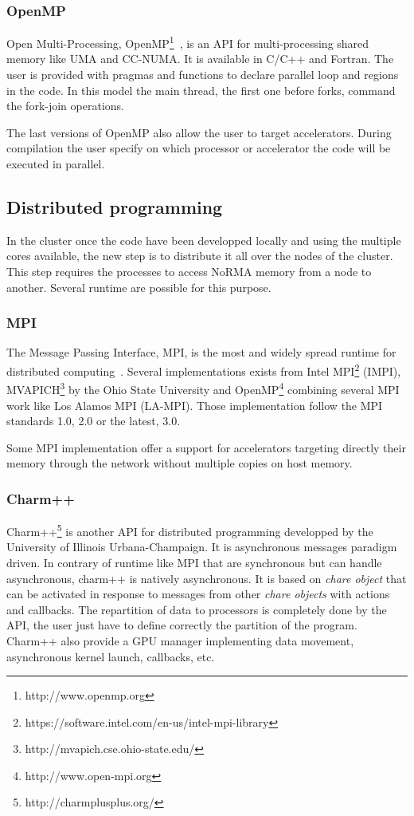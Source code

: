 \subsubsection{OpenMP}
Open Multi-Processing, OpenMP\footnote{http://www.openmp.org}~\cite{chapman2008using,supinski2017scaling}, is an API for multi-processing shared memory like UMA and CC-NUMA.
It is available in C/C++ and Fortran.
The user is provided with pragmas and functions to declare parallel loop and regions in the code. 
In this model the main thread, the first one before forks, command the fork-join operations. 

The last versions of OpenMP also allow the user to target accelerators. 
During compilation the user specify on which processor or accelerator the code will be executed in parallel. 

\subsection{Distributed programming}
In the cluster once the code have been developped locally and using the multiple cores available, the new step is to distribute it all over the nodes of the cluster. 
This step requires the processes to access NoRMA memory from a node to another. 
Several runtime are possible for this purpose.

\subsubsection{MPI}
The Message Passing Interface, MPI, is the most and widely spread runtime for distributed computing~\cite{gropp2014using,gropp2015using}.
Several implementations exists from Intel MPI\footnote{https://software.intel.com/en-us/intel-mpi-library} (IMPI), MVAPICH\footnote{http://mvapich.cse.ohio-state.edu/} by the Ohio State University and OpenMP\footnote{http://www.open-mpi.org} combining several MPI work like Los Alamos MPI (LA-MPI).
Those implementation follow the MPI standards 1.0, 2.0 or the latest, 3.0. 

Some MPI implementation offer a support for accelerators targeting directly their memory through the network without multiple copies on host memory. 

\subsubsection{Charm++}
Charm++\footnote{http://charmplusplus.org/} is another API for distributed programming developped by the University of Illinois Urbana-Champaign.
It is asynchronous messages paradigm driven.
In contrary of runtime like MPI that are synchronous but can handle asynchronous, charm++ is natively asynchronous. 
It is based on \textit{chare object} that can be activated in response to messages from other \textit{chare objects} with actions and callbacks. 
The repartition of data to processors is completely done by the API, the user just have to define correctly the partition of the program. 
Charm++ also provide a GPU manager implementing data movement, asynchronous kernel launch, callbacks, etc.

